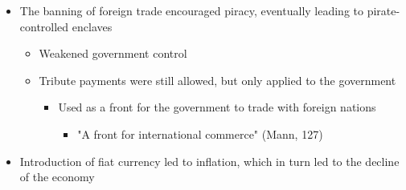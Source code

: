 \documentclass[letterpaper]{article}
\begin{document}
\begin{itemize}
\begin{itemize}
\item The banning of foreign trade encouraged piracy, eventually leading
to pirate-controlled enclaves

\begin{itemize}
\item Weakened government control
\item Tribute payments were still allowed, but only applied to the
government

\begin{itemize}
\item Used as a front for the government to trade with foreign nations

\begin{itemize}
\item "A front for international commerce" (Mann, 127)
\end{itemize}
\end{itemize}
\end{itemize}

\item Introduction of fiat currency led to inflation, which in turn led to
the decline of the economy
\end{itemize}
\end{itemize}
\end{document}
